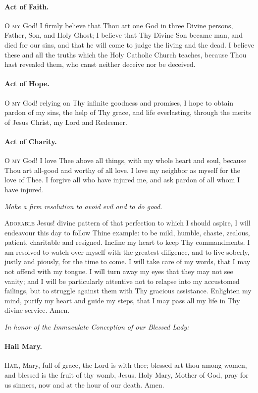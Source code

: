 \documentclass{article}
\begin{document}
\begin{multicols}{3}
\paragraph{Act of Faith.}
\textsc{O my} God! I firmly believe that Thou art one God in three Divine persons,
Father, Son, and Holy Ghost; I believe that Thy Divine Son became man,
and died for our sins, and that he will come to judge the living and the
dead. I believe these and all the truths which the Holy Catholic Church
teaches, because Thou hast revealed them, who canst neither deceive nor
be deceived.

\paragraph{Act of Hope.}
\textsc{O my} God! relying on Thy infinite goodness and promises, I hope to obtain
pardon of my sins, the help of Thy grace, and life everlasting, through
the merits of Jesus Christ, my Lord and Redeemer. 

\paragraph{Act of Charity.}
\textsc{O my} God! I love Thee above all things, with my whole heart and soul,
because Thou art all-good and worthy of all love. I love my neighbor as
myself for the love of Thee. I forgive all who have injured me, and ask
pardon of all whom I have injured. 

\textit{Make a firm resolution to avoid evil and to do good.}

\textsc{Adorable} Jesus! divine pattern of that perfection to which I should aspire,
I will endeavour this day to follow Thine example: to be mild, humble, chaste,
zealous, patient, charitable and resigned. Incline my heart to keep Thy
commandments. I am resolved to watch over myself with the greatest diligence,
and to live soberly, justly and piously, for the time to come. I will take
care of my words, that I may not offend with my tongue. I will turn away my
eyes that they may not see vanity; and I will be particularly attentive not
to relapse into my accustomed failings, but to struggle against them with Thy
gracious assistance. Enlighten my mind, purify my heart and guide my steps,
that I may pass all my life in Thy divine service. Amen.

\textit{In honor of the Immaculate Conception of our Blessed Lady:}

\paragraph{Hail Mary.}
\textsc{Hail}, Mary, full of grace, the Lord is with thee;
blessed art thou among women, and blessed is the fruit of
thy womb, Jesus.  Holy Mary, Mother of God, pray for us sinners,
now and at the hour of our death. Amen.


\end{multicols}
\end{document}
